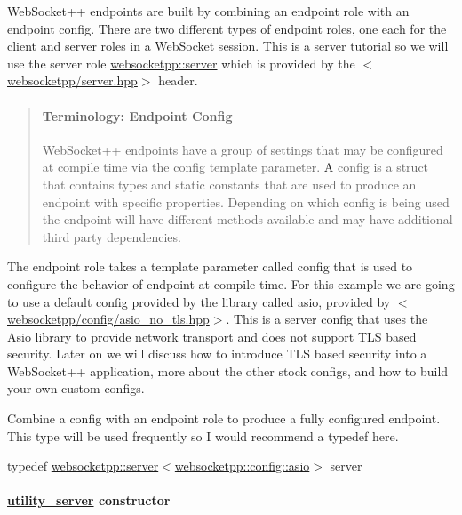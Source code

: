 Web\+Socket++ endpoints are built by combining an endpoint role with an endpoint config. There are two different types of endpoint roles, one each for the client and server roles in a Web\+Socket session. This is a server tutorial so we will use the server role {\ttfamily \mbox{\hyperlink{classwebsocketpp_1_1server}{websocketpp\+::server}}} which is provided by the {\ttfamily $<$\mbox{\hyperlink{server_8hpp_source}{websocketpp/server.\+hpp}}$>$} header.

\begin{quote}
\paragraph*{Terminology\+: Endpoint Config}

Web\+Socket++ endpoints have a group of settings that may be configured at compile time via the {\ttfamily config} template parameter. \mbox{\hyperlink{struct_a}{A}} config is a struct that contains types and static constants that are used to produce an endpoint with specific properties. Depending on which config is being used the endpoint will have different methods available and may have additional third party dependencies. \end{quote}


The endpoint role takes a template parameter called {\ttfamily config} that is used to configure the behavior of endpoint at compile time. For this example we are going to use a default config provided by the library called {\ttfamily asio}, provided by {\ttfamily $<$\mbox{\hyperlink{asio__no__tls_8hpp_source}{websocketpp/config/asio\+\_\+no\+\_\+tls.\+hpp}}$>$}. This is a server config that uses the Asio library to provide network transport and does not support T\+LS based security. Later on we will discuss how to introduce T\+LS based security into a Web\+Socket++ application, more about the other stock configs, and how to build your own custom configs.

Combine a config with an endpoint role to produce a fully configured endpoint. This type will be used frequently so I would recommend a typedef here.

{\ttfamily typedef \mbox{\hyperlink{classwebsocketpp_1_1server}{websocketpp\+::server}}$<$\mbox{\hyperlink{structwebsocketpp_1_1config_1_1asio}{websocketpp\+::config\+::asio}}$>$ server}

\paragraph*{{\ttfamily \mbox{\hyperlink{classutility__server}{utility\+\_\+server}}} constructor}

